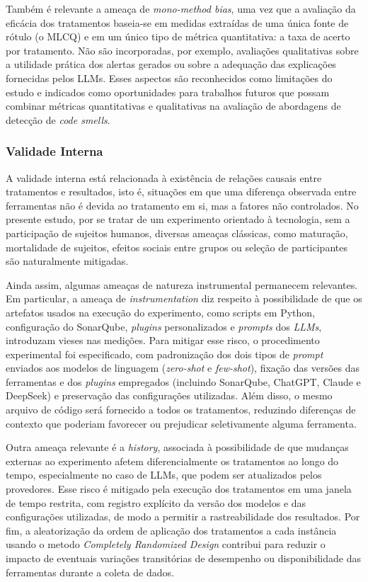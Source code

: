 Também é relevante a ameaça de \textit{mono-method bias}, uma vez que a avaliação da eficácia dos tratamentos baseia-se em medidas extraídas de uma única fonte 
de rótulo (o MLCQ) e em um único tipo de métrica quantitativa: a taxa de acerto por tratamento. Não são incorporadas, 
por exemplo, avaliações qualitativas sobre a utilidade prática dos alertas gerados ou sobre a adequação das explicações fornecidas pelos LLMs. Esses 
aspectos são reconhecidos como limitações do estudo e indicados como oportunidades para trabalhos futuros que possam combinar métricas quantitativas e 
qualitativas na avaliação de abordagens de detecção de \textit{code smells}.

\subsubsection*{Validade Interna}

A validade interna está relacionada à existência de relações causais entre tratamentos e resultados, isto é, situações em que uma diferença observada entre 
ferramentas não é devida ao tratamento em si, mas a fatores não controlados. No presente estudo, por se tratar de um experimento orientado à tecnologia, 
sem a participação de sujeitos humanos, diversas ameaças clássicas, como maturação, mortalidade de sujeitos, efeitos sociais entre grupos ou seleção de 
participantes são naturalmente mitigadas.

    Ainda assim, algumas ameaças de natureza instrumental permanecem relevantes. Em particular, a ameaça de \textit{instrumentation} diz respeito à possibilidade 
    de que os artefatos usados na execução do experimento, como scripts em Python, configuração do SonarQube, \textit{plugins} personalizados e \textit{prompts} dos \textit{LLMs}, introduzam vieses nas medições. 
    Para mitigar esse risco, o procedimento experimental foi especificado, com padronização dos dois tipos de \textit{prompt} enviados aos modelos de linguagem 
    (\textit{zero-shot} e \textit{few-shot}), fixação das versões das ferramentas e dos \textit{plugins} empregados (incluindo SonarQube, ChatGPT, Claude e DeepSeek) e preservação das configurações utilizadas. Além 
    disso, o mesmo arquivo de código será fornecido a todos os tratamentos, reduzindo diferenças de contexto que poderiam favorecer ou prejudicar seletivamente 
    alguma ferramenta.

Outra ameaça relevante é a \textit{history}, associada à possibilidade de que mudanças externas ao experimento afetem diferencialmente os tratamentos ao longo 
do tempo, especialmente no caso de LLMs, que podem ser atualizados pelos provedores. Esse risco é mitigado pela execução dos tratamentos em uma janela de tempo 
restrita, com registro explícito da versão dos modelos e das configurações utilizadas, de modo a permitir a rastreabilidade dos resultados. Por fim, a 
aleatorização da ordem de aplicação dos tratamentos a cada instância usando o metodo \textit{Completely Randomized Design} contribui para reduzir o impacto de eventuais 
variações transitórias de desempenho ou disponibilidade das ferramentas durante a coleta de dados.

